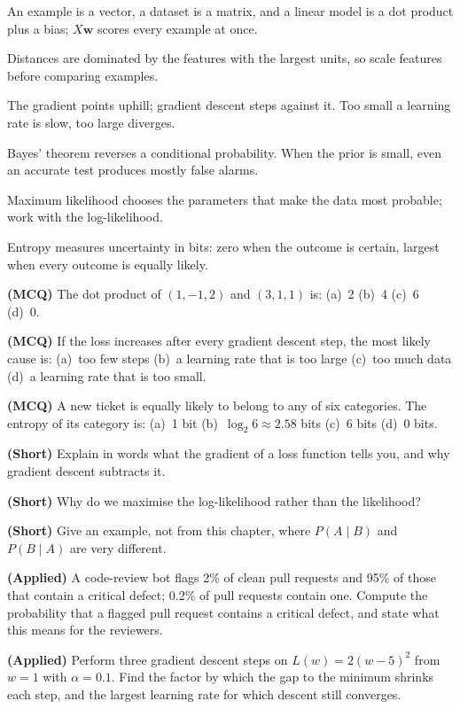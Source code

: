 \begin{chaptersummary}
\begin{tight}
  \item An example is a vector, a dataset is a matrix, and a linear model is a
        dot product plus a bias; $X\mathbf{w}$ scores every example at once.
  \item Distances are dominated by the features with the largest units, so scale
        features before comparing examples.
  \item The gradient points uphill; gradient descent steps against it. Too small
        a learning rate is slow, too large diverges.
  \item Bayes' theorem reverses a conditional probability. When the prior is
        small, even an accurate test produces mostly false alarms.
  \item Maximum likelihood chooses the parameters that make the data most
        probable; work with the log-likelihood.
  \item Entropy measures uncertainty in bits: zero when the outcome is certain,
        largest when every outcome is equally likely.
\end{tight}
\end{chaptersummary}

\begin{reviewq}
  \item \textbf{(MCQ)} The dot product of $(1, -1, 2)$ and $(3, 1, 1)$ is:
        (a)~2 (b)~4 (c)~6 (d)~0.
  \item \textbf{(MCQ)} If the loss increases after every gradient descent step,
        the most likely cause is: (a)~too few steps (b)~a learning rate that is
        too large (c)~too much data (d)~a learning rate that is too small.
  \item \textbf{(MCQ)} A new ticket is equally likely to belong to any of six
        categories. The entropy of its category is: (a)~1 bit
        (b)~$\log_2 6 \approx 2.58$ bits (c)~6 bits (d)~0 bits.
  \item \textbf{(Short)} Explain in words what the gradient of a loss function
        tells you, and why gradient descent subtracts it.
  \item \textbf{(Short)} Why do we maximise the log-likelihood rather than the
        likelihood?
  \item \textbf{(Short)} Give an example, not from this chapter, where
        $P(A\mid B)$ and $P(B \mid A)$ are very different.
  \item \textbf{(Applied)} A code-review bot flags 2\% of clean pull requests
        and 95\% of those that contain a critical defect; 0.2\% of pull requests
        contain one. Compute the probability that a flagged pull request contains
        a critical defect, and state what this means for the reviewers.
  \item \textbf{(Applied)} Perform three gradient descent steps on
        $L(w) = 2(w-5)^2$ from $w = 1$ with $\alpha = 0.1$. Find the factor by
        which the gap to the minimum shrinks each step, and the largest
        learning rate for which descent still converges.
\end{reviewq}
